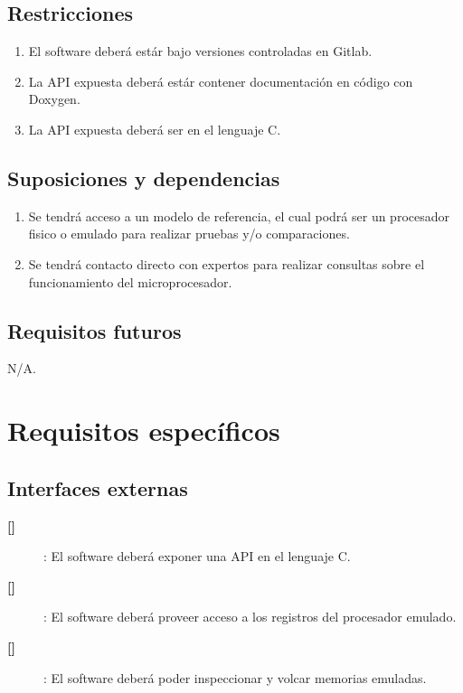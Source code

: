 \documentclass[
  11pt, %
  codirector, %
]{charter}
\makeatletter
\newcommand{\mytwodigits}[1]{\two@digits{#1}}
\newcounter{reqCounter}
\makeatother
\begin{document}
\subsection{Restricciones}
\label{sec:org5ca5790}

\begin{enumerate}
\item El software deberá estár bajo versiones controladas en Gitlab.
\item La API expuesta deberá estár contener documentación en código con Doxygen.
\item La API expuesta deberá ser en el lenguaje C.
\end{enumerate}

\subsection{Suposiciones y dependencias}
\label{sec:org0ae23fe}

\begin{enumerate}
\item Se tendrá acceso a un modelo de referencia, el cual podrá ser un procesador fisico o emulado para realizar pruebas y/o comparaciones.
\item Se tendrá contacto directo con expertos para realizar consultas sobre el funcionamiento del microprocesador.
\end{enumerate}

\subsection{Requisitos futuros}
\label{sec:org33cfcdb}

N/A.


\section{Requisitos específicos}
\label{sec:org40573d1}



\subsection{Interfaces externas}
\label{sec:orgfd5391f}

\begin{description}

\item[\textbf{[\CODrequerimiento\mytwodigits{\value{reqCounter}}]}]: El software deberá exponer una API en el lenguaje C.

\item[\textbf{[\CODrequerimiento\mytwodigits{\value{reqCounter}}]}]: El software deberá proveer acceso a los registros del procesador emulado.

\item[\textbf{[\CODrequerimiento\mytwodigits{\value{reqCounter}}]}]:  El software deberá poder inspeccionar y volcar memorias emuladas.


\end{description}
\end{document}
